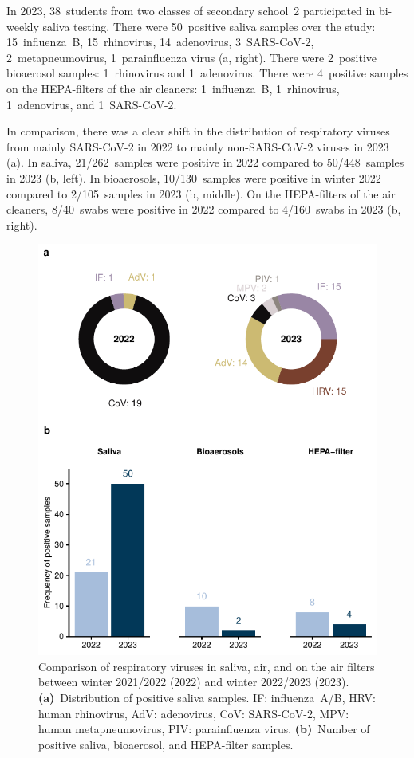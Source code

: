 \documentclass[fleqn,11pt]{wlscirep}
\begin{document}
In 2023, 38~students from two classes of secondary school~2 participated in bi-weekly saliva testing. There were 50~positive saliva samples over the study: 15~influenza~B, 15~rhinovirus, 14~adenovirus, 3~SARS-CoV-2, 2~metapneumovirus, 1~parainfluenza virus (a, right). There were 2~positive bioaerosol samples: 1~rhinovirus and 1~adenovirus. There were 4~positive samples on the HEPA-filters of the air cleaners: 1~influenza~B, 1~rhinovirus, 1~adenovirus, and 1~SARS-CoV-2. 

In comparison, there was a clear shift in the distribution of respiratory viruses from mainly SARS-CoV-2 in 2022 to mainly non-SARS-CoV-2 viruses in 2023 (a). In saliva, 21/262~samples were positive in 2022 compared to 50/448~samples in 2023 (b, left). In bioaerosols, 10/130~samples were positive in winter 2022 compared to 2/105~samples in 2023  (b, middle). On the HEPA-filters of the air cleaners, 8/40~swabs were positive in 2022 compared to 4/160~swabs in 2023 (b, right). 

\begin{figure}
    \centering
    \includegraphics{results/comparison.pdf}
    \caption{Comparison of respiratory viruses in saliva, air, and on the air filters between winter 2021/2022 (2022) and winter 2022/2023 (2023). \textbf{(a)}~Distribution of positive saliva samples. IF: influenza~A/B, HRV: human rhinovirus, AdV: adenovirus, CoV: SARS-CoV-2, MPV: human metapneumovirus, PIV: parainfluenza virus. \textbf{(b)}~Number of positive saliva, bioaerosol, and HEPA-filter samples.}
    \label{fig:comparison}
\end{figure}
\end{document}
